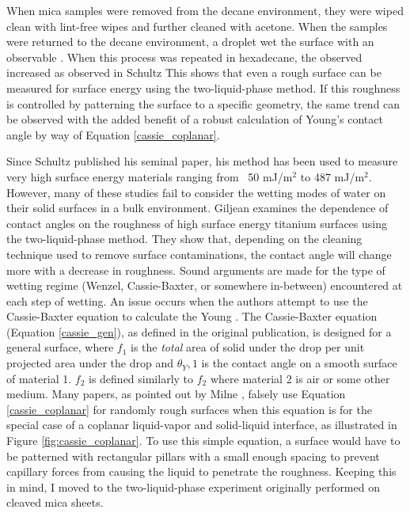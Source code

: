 When mica samples were removed from the decane environment, they were wiped clean with lint-free wipes and further cleaned with acetone. When the samples were returned to the decane environment, a droplet wet the surface with an observable \ca. When this process was repeated in hexadecane, the observed \ca increased as observed in Schultz \etal This shows that even a rough surface can be measured for surface energy using the two-liquid-phase method. If this roughness is controlled by patterning the surface to a specific geometry, the same trend can be observed with the added benefit of a robust calculation of Young's contact angle by way of Equation \ref{cassie_coplanar}. 

Since Schultz published his seminal paper, his method has been used to measure very high surface energy materials ranging from ~50 mJ/m$^{2}$ to 487 mJ/m$^{2}$.\cite{Nakamura2015} However, many of these studies fail to consider the wetting modes of water on their solid surfaces in a bulk \nalk environment. Giljean \etal examines the dependence of contact angles on the roughness of high surface energy titanium surfaces using the two-liquid-phase method. They show that, depending on the cleaning technique used to remove surface contaminations, the contact angle will change more with a decrease in roughness. Sound arguments are made for the type of wetting regime (Wenzel, Cassie-Baxter, or somewhere in-between) encountered at each step of wetting. An issue occurs when the authors attempt to use the Cassie-Baxter equation to calculate the Young \ca. The Cassie-Baxter equation (Equation \ref{cassie_gen}), as defined in the original publication,\cite{Cassie1944} is designed for a general surface, where $f_1$ is the \textit{total} area of solid under the drop per unit projected area under the drop and $\theta_Y,1$ is the contact angle on a smooth surface of material 1. $f_2$ is defined similarly to $f_2$ where material 2 is air or some other medium. Many papers, as pointed out by Milne \etal,\cite{Milne2012} falsely use Equation \ref{cassie_coplanar} for randomly rough surfaces when this equation is for the special case of a coplanar liquid-vapor and solid-liquid interface, as illustrated in Figure \ref{fig:cassie_coplanar}. To use this simple equation, a surface would have to be patterned with rectangular pillars with a small enough spacing to prevent capillary forces from causing the liquid to penetrate the roughness. Keeping this in mind, I moved to the two-liquid-phase experiment originally performed on cleaved mica sheets. 